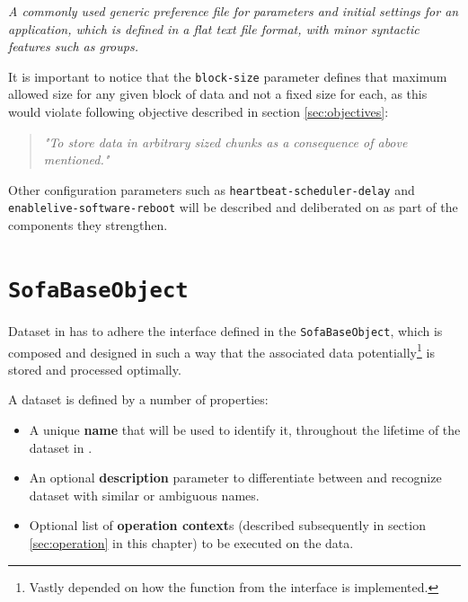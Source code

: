 \vspace*{4mm}
\begin{definition}[.cfg] \label{def:cfg}
\textit{A commonly used generic preference file for parameters and initial settings for an application, which is defined in a flat text file format, with minor syntactic features such as groups.}
\end{definition}
\vspace*{6mm}

It is important to notice that the \texttt{block-size} parameter defines that maximum allowed size for any given block of data and not a fixed size for each, as this would violate following objective described in section \ref{sec:objectives}:

\begin{quotation}
	\textit{"To store data in arbitrary sized chunks as a consequence of above mentioned."}
\end{quotation}

Other configuration parameters such as \texttt{heartbeat-scheduler-delay} and \texttt{enable\-live-software-reboot} will be described and deliberated on as part of the components they strengthen.

\section{\texttt{SofaBaseObject}} \label{sec:sofabaseobject}
Dataset in \CodeName has to adhere the interface defined in the \texttt{SofaBaseObject}, which is composed and designed in such a way that the associated data potentially\footnote{Vastly depended on how the function from the interface is implemented.} is stored and processed optimally.

\vspace*{5mm}
A dataset is defined by a number of properties:
\begin{itemize}
	\item A unique \textbf{name} that will be used to identify it, throughout the lifetime of the dataset in \CodeName.
	\item An optional \textbf{description} parameter to differentiate between and recognize dataset with similar or ambiguous names.
	\item Optional list of \textbf{operation context}s (described subsequently in section \ref{sec:operation} in this chapter) to be executed on the data.
\end{itemize}
\vspace*{5mm}

